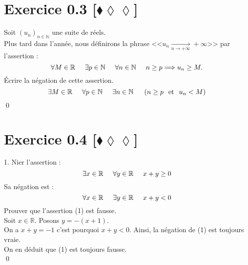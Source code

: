 \documentclass[10pt]{article}
\begin{document}
\section*{Exercice 0.3 [$\blacklozenge\lozenge\lozenge$]}
\begin{tcolorbox}[enhanced, width=7in, center, size=fbox, fontupper=\large, drop shadow southwest]
    Soit $(u_n)_{n\in\mathbb{N}}$ une suite de réels.\\
    Plus tard dans l'année, nous définirons la phrase <<$u_n\underset{n\rightarrow+\infty}{\longrightarrow}+\infty$>> par l'assertion :
    \begin{equation*}
        \forall M\in\mathbb{R}\hspace{0.5cm}\exists p\in\mathbb{N}\hspace{0.5cm} \forall{n}\in\mathbb{N}\hspace{0.5cm}n\geq p\Longrightarrow u_n\geq M.
    \end{equation*}
    Écrire la négation de cette assertion.
    \begin{equation*}
        \exists{M\in\mathbb{R}}\hspace{0.5cm}\forall{p\in\mathbb{N}}\hspace{0.5cm}\exists{n\in\mathbb{N}}\hspace{0.5cm}\left(n\geq{p}\hspace{0.25cm}\text{et}\hspace{0.25cm}u_n<M\right)
    \end{equation*}
    \qed
\end{tcolorbox}

\section*{Exercice 0.4 [$\blacklozenge\lozenge\lozenge$]}
\begin{tcolorbox}[enhanced, width=7in, center, size=fbox, fontupper=\large, drop shadow southwest]
    1. Nier l'assertion :
    \begin{equation}
        \exists{x\in\mathbb{R}}\hspace{0.5cm}\forall{y\in\mathbb{R}}\hspace{0.5cm}x+y\geq0
    \end{equation}
    Sa négation est :
    \begin{equation*}
        \forall{x\in\mathbb{R}}\hspace{0.5cm}\exists{y\in\mathbb{R}}\hspace{0.5cm}x+y<0
    \end{equation*}
    Prouver que l'assertion (1) est fausse.\\
    Soit $x\in\mathbb{R}$. Posons $y=-(x+1)$.\\
    On a $x+y=-1$ c'est pourquoi $x+y<0$. Ainsi, la négation de (1) est toujours vraie.\\
    On en déduit que (1) est toujours fausse.\\
    \qed
\end{tcolorbox}
\end{document}
